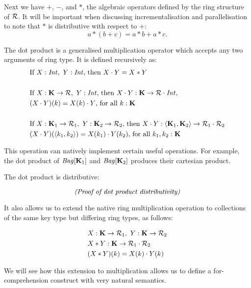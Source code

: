 {{{Next we have $+$, $-$, and $\ast$, the algebraic operators defined by the ring structure of $\mathcal{R}$. It will be important when discussing incrementalisation and parallelisation to note that  $\ast$ is distributive with respect to $+$:
\[
a*(b + c) = a*b + a*c.
\]

The dot product is a generalised multiplication operator which accepts any two arguments of ring type. It is defined recursively as:
\begin{equation*}
\begin{split}
& \textrm{If } X: \textrm{\textit{Int}}, \ Y: \textrm{\textit{Int}}\textrm{, then } X \cdot Y = X * Y \\ \\
& \textrm{If } X: \mathbf{K} \rightarrow \mathcal{R}, \ Y: \textrm{\textit{Int}}\textrm{, then } X \cdot Y : \mathbf{K} \rightarrow \mathcal{R} \cdot \textrm{\textit{Int}}, \\
& (X \cdot Y)(k) = X(k) \cdot Y\textrm{, for all }k: \mathbf{K} \\ \\
& \textrm{If } X: \mathbf{K}_1 \rightarrow \mathcal{R}_1, \ Y: \mathbf{K}_2 \rightarrow \mathcal{R}_2\textrm{, then } X \cdot Y : \langle \mathbf{K}_1, \mathbf{K}_2 \rangle \rightarrow \mathcal{R}_1 \cdot \mathcal{R}_2 \\
& (X \cdot Y)(\langle k_1, k_2 \rangle) = X(k_1) \cdot Y(k_2)\textrm{, for all }k_1,k_2: \mathbf{K}
\end{split}
\end{equation*}

This operation can natively implement certain useful operations. For example, the dot product of $\textrm{\textit{Bag}}[\mathbf{K}_1]$ and $\textrm{\textit{Bag}}[\mathbf{K}_2]$ produces their cartesian product.

The dot product is distributive:

\begin{equation*}
\textrm{\textit{(Proof of dot product distributivity)}}
\end{equation*}

It also allows us to extend the native ring multiplication operation to collections of the same key type but differing ring types, as follows:

\begin{equation*}
\begin{split}
& X: \mathbf{K} \rightarrow \mathcal{R}_1, \ Y: \mathbf{K} \rightarrow \mathcal{R}_2 \\
& X * Y : \mathbf{K} \rightarrow \mathcal{R}_1 \cdot \mathcal{R}_2 \\
& (X*Y)(k) = X(k) \cdot Y(k)
\end{split}
\end{equation*}

We will see how this extension to multiplication allows us to define a for-comprehension construct with very natural semantics.

}}}
